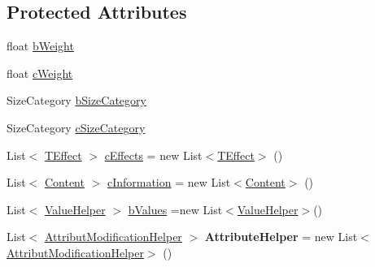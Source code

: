 \subsection*{Protected Attributes}
\begin{DoxyCompactItemize}
\item 
float \hyperlink{class_r_p_g_object_a550507f127d2915aa0b7a95ef5e3feb6}{b\+Weight}
\item 
float \hyperlink{class_r_p_g_object_a098dcfa4772557888348f5164da509f8}{c\+Weight}
\item 
Size\+Category \hyperlink{class_r_p_g_object_ae5cb76ccbe4f37237cc03a9737009577}{b\+Size\+Category}
\item 
Size\+Category \hyperlink{class_r_p_g_object_a5076aeba98770e8507778eb6051df87b}{c\+Size\+Category}
\item 
List$<$ \hyperlink{class_t_effect}{T\+Effect} $>$ \hyperlink{class_r_p_g_object_a833cf33788a1040a7fdcb703d6e3126d}{c\+Effects} = new List$<$\hyperlink{class_t_effect}{T\+Effect}$>$ ()
\item 
List$<$ \hyperlink{struct_content}{Content} $>$ \hyperlink{class_r_p_g_object_ac5b133eca19e8f97988722018cdf139b}{c\+Information} = new List$<$\hyperlink{struct_content}{Content}$>$ ()
\item 
List$<$ \hyperlink{class_r_p_g_object_1_1_value_helper}{Value\+Helper} $>$ \hyperlink{class_r_p_g_object_aca7f376707b78c0852b0001ee67dc80f}{b\+Values} =new List$<$\hyperlink{class_r_p_g_object_1_1_value_helper}{Value\+Helper}$>$()
\item 
\hypertarget{class_r_p_g_object_a19aea805ab96ccaa5bd202bebe6ff482}{}List$<$ \hyperlink{class_r_p_g_object_1_1_attribut_modification_helper}{Attribut\+Modification\+Helper} $>$ {\bfseries Attribute\+Helper} = new List$<$\hyperlink{class_r_p_g_object_1_1_attribut_modification_helper}{Attribut\+Modification\+Helper}$>$ ()\label{class_r_p_g_object_a19aea805ab96ccaa5bd202bebe6ff482}

\end{DoxyCompactItemize}
